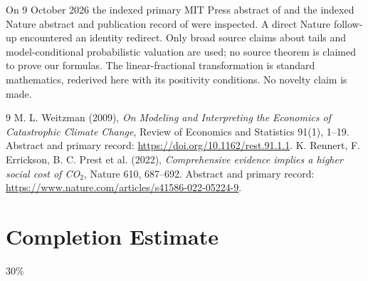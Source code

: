 \documentclass[11pt]{article}
\begin{document}
On 9 October 2026 the indexed primary MIT Press abstract of \cite{W} and
the indexed Nature abstract and publication record of \cite{R} were
inspected. A direct Nature follow-up encountered an identity redirect.
Only broad source claims about tails and model-conditional probabilistic
valuation are used; no source theorem is claimed to prove our formulas.
The linear-fractional transformation is standard mathematics, rederived
here with its positivity conditions. No novelty claim is made.
\begin{thebibliography}{9}
 M. L. Weitzman (2009), \emph{On Modeling and Interpreting the
Economics of Catastrophic Climate Change}, Review of Economics and
Statistics 91(1), 1--19. Abstract and primary record:
\url{https://doi.org/10.1162/rest.91.1.1}.
 K. Rennert, F. Errickson, B. C. Prest et al. (2022),
\emph{Comprehensive evidence implies a higher social cost of CO$_2$},
Nature 610, 687--692. Abstract and primary record:
\url{https://www.nature.com/articles/s41586-022-05224-9}.
\end{thebibliography}

\section{Completion Estimate}
30\%
\end{document}
